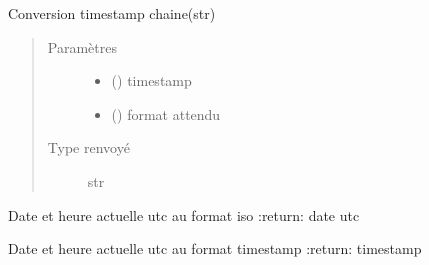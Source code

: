 \documentclass[letterpaper,10pt,french]{sphinxmanual}
\begin{document}

\begin{fulllineitems}
\label{\detokenize{modules/dtemng:toolbox.dtemng.tstring}}
Conversion timestamp \sphinxhyphen{} chaine(str)
\begin{quote}\begin{description}
\item[{Paramètres}] \leavevmode\begin{itemize}
\item {} 
 () \textendash{} timestamp

\item {} 
 () \textendash{} format attendu

\end{itemize}

\item[{Type renvoyé}] \leavevmode
str

\end{description}\end{quote}

\end{fulllineitems}


\begin{fulllineitems}
\label{\detokenize{modules/dtemng:toolbox.dtemng.utcnow_iso}}
Date et heure actuelle utc au format iso
:return: date utc

\end{fulllineitems}


\begin{fulllineitems}
\label{\detokenize{modules/dtemng:toolbox.dtemng.utcnow_ts}}
Date et heure actuelle utc au format timestamp
:return: timestamp

\end{fulllineitems}
\end{document}
